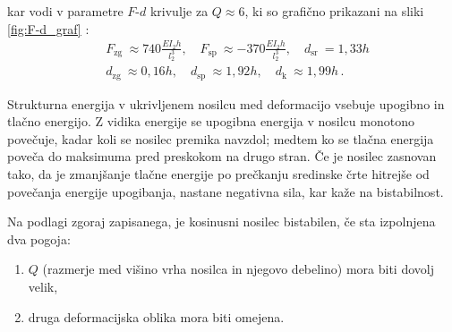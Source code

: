         kar vodi v parametre $F$-$d$ krivulje za $Q \approx 6$, ki so grafično prikazani na sliki \ref{fig:F-d_graf} :
        \begin{equation}\label{eq:bistabilnostne_en_1}
            \begin{aligned}
            &F_{\text {zg }} \approx 740 \frac{E I_2 h}{l_2^3}, \quad F_{\text {sp }} \approx -370 \frac{E I_2 h}{l_2^3}, \quad d_{\text {sr }}=1,33 h \\
            &d_{\text {zg }} \approx 0,16 h, \quad d_{\text {sp }} \approx 1,92 h, \quad d_{\text {k }} \approx 1,99 h \,.
            \end{aligned}
        \end{equation}
        
        
        
        
        Strukturna energija v ukrivljenem nosilcu med deformacijo vsebuje upogibno in tlačno energijo. Z vidika energije se upogibna energija v nosilcu monotono povečuje, kadar koli se nosilec premika navzdol; medtem ko se tlačna energija poveča do maksimuma pred preskokom na drugo stran. Če je nosilec zasnovan tako, da je zmanjšanje tlačne energije po prečkanju sredinske črte hitrejše od povečanja energije upogibanja, nastane negativna sila, kar kaže na bistabilnost. 
        
        Na podlagi zgoraj zapisanega, je kosinusni nosilec bistabilen, če sta izpolnjena dva pogoja:
        \begin{enumerate}
          \item $Q$ (razmerje med višino vrha nosilca in njegovo debelino) mora biti dovolj velik,
          \item druga deformacijska oblika mora biti omejena.
        \end{enumerate}
        
